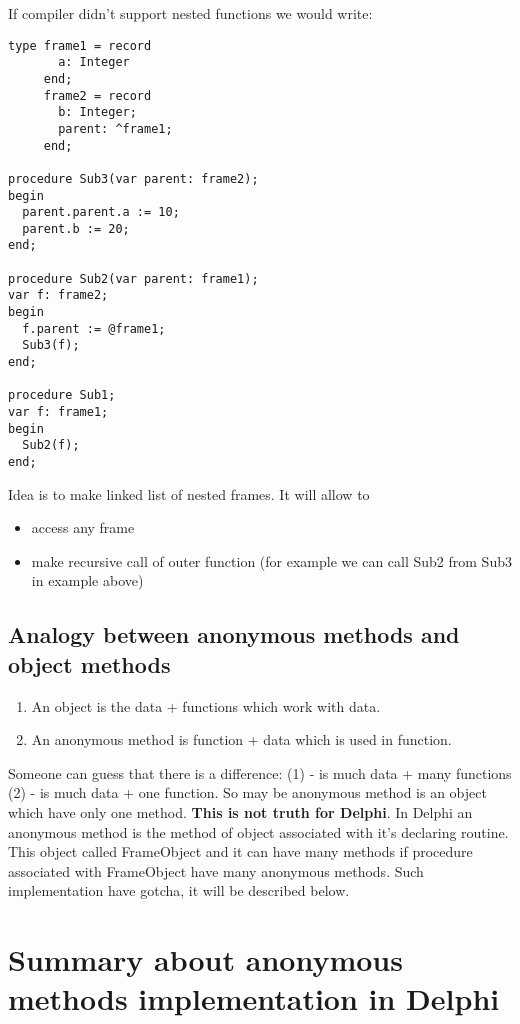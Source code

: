 \documentclass[11pt]{article}
\begin{document}
If compiler didn't support nested functions we would write:


\begin{verbatim}
type frame1 = record
       a: Integer
     end;
     frame2 = record
       b: Integer;
       parent: ^frame1;
     end;

procedure Sub3(var parent: frame2);
begin
  parent.parent.a := 10;
  parent.b := 20;
end;

procedure Sub2(var parent: frame1);
var f: frame2;
begin
  f.parent := @frame1;
  Sub3(f);
end;

procedure Sub1;
var f: frame1;
begin
  Sub2(f);
end;
\end{verbatim}

Idea is to make linked list of nested frames. It will allow to
\begin{itemize}
\item access any frame
\item make recursive call of outer function (for example we can call Sub2
  from Sub3 in example above)
\end{itemize}
\subsection{Analogy between anonymous methods and object methods}
\label{sec-4-3}


\begin{enumerate}
\item An object is the data + functions which work with data.
\item An anonymous method is function + data which is used in function.
\end{enumerate}
Someone can guess that there is a difference:
(1) - is much data + many functions
(2) - is much data + one function.
So may be anonymous method is an object which have only one method.
\textbf{This is not truth for Delphi}. In Delphi an anonymous method is the
method of object associated with it's declaring routine. This object
called FrameObject and it can have many methods if procedure associated
with FrameObject have many anonymous methods. Such implementation have
gotcha, it will be described below.
\section{Summary about anonymous methods implementation in Delphi}
\label{sec-5}
\end{document}
